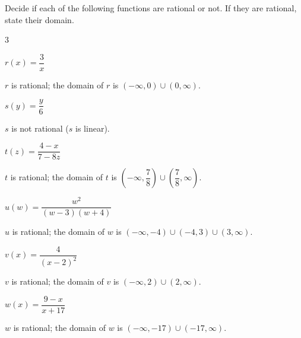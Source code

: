 	 \begin{exercises}
	 \begin{problem}
	 Decide if each of the following functions are rational or not. If
	 they are rational, state their domain.
	 \begin{multicols}{3}
		 \begin{subproblem}
			 $r(x)=\dfrac{3}{x}$
			 \begin{shortsolution}
				 $r$ is rational; the domain of $r$ is $(-\infty,0)\cup (0,\infty)$.
			 \end{shortsolution}
		 \end{subproblem}
		 \begin{subproblem}
			 $s(y)=\dfrac{y}{6}$
			 \begin{shortsolution}
				 $s$ is not rational ($s$ is linear).
			 \end{shortsolution}
		 \end{subproblem}
		 \begin{subproblem}
			 $t(z)=\dfrac{4-x}{7-8z}$
			 \begin{shortsolution}
				 $t$ is rational; the domain of $t$ is $\left( -\infty,\dfrac{7}{8} \right)\cup \left( \dfrac{7}{8},\infty \right)$.
			 \end{shortsolution}
		 \end{subproblem}
		 \begin{subproblem}
			 $u(w)=\dfrac{w^2}{(w-3)(w+4)}$
			 \begin{shortsolution}
				 $u$ is rational; the domain of $w$ is $(-\infty,-4)\cup(-4,3)\cup(3,\infty)$.
			 \end{shortsolution}
		 \end{subproblem}
		 \begin{subproblem}
			 $v(x)=\dfrac{4}{(x-2)^2}$
			 \begin{shortsolution}
				 $v$ is rational; the domain of $v$ is $(-\infty,2)\cup(2,\infty)$.
			 \end{shortsolution}
		 \end{subproblem}
		 \begin{subproblem}
			 $w(x)=\dfrac{9-x}{x+17}$
			 \begin{shortsolution}
				 $w$ is rational; the domain of $w$ is $(-\infty,-17)\cup(-17,\infty)$.
			 \end{shortsolution}
		 \end{subproblem}
		 \begin{subproblem}

\end{subproblem}
\end{multicols}
\end{problem}
\end{exercises}
